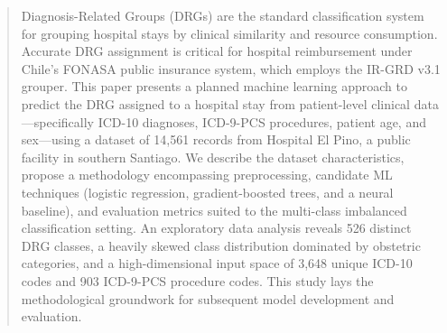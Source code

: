 \begin{abstract}
Diagnosis-Related Groups (DRGs) are the standard classification system for grouping hospital stays by clinical similarity and resource consumption. Accurate DRG assignment is critical for hospital reimbursement under Chile's FONASA public insurance system, which employs the IR-GRD v3.1 grouper. This paper presents a planned machine learning approach to predict the DRG assigned to a hospital stay from patient-level clinical data---specifically ICD-10 diagnoses, ICD-9-PCS procedures, patient age, and sex---using a dataset of 14,561 records from Hospital El Pino, a public facility in southern Santiago. We describe the dataset characteristics, propose a methodology encompassing preprocessing, candidate ML techniques (logistic regression, gradient-boosted trees, and a neural baseline), and evaluation metrics suited to the multi-class imbalanced classification setting. An exploratory data analysis reveals 526 distinct DRG classes, a heavily skewed class distribution dominated by obstetric categories, and a high-dimensional input space of 3,648 unique ICD-10 codes and 903 ICD-9-PCS procedure codes. This study lays the methodological groundwork for subsequent model development and evaluation.
\end{abstract}
